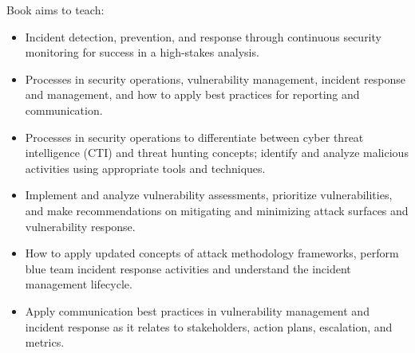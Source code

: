 Book aims to teach:
\begin{itemize}
    \item Incident detection, prevention, and response through continuous security monitoring for success in a high-stakes analysis.
    \item Processes in security operations, vulnerability management, incident response and management, and how to apply best practices for reporting and communication.
    \item Processes in security operations to differentiate between cyber threat intelligence (CTI) and threat hunting concepts; identify and analyze malicious activities using appropriate tools and techniques.
    \item Implement and analyze vulnerability assessments, prioritize vulnerabilities, and make recommendations on mitigating and minimizing attack surfaces and vulnerability response.
    \item How to apply updated concepts of attack methodology frameworks, perform blue team incident response activities and understand the incident management lifecycle.
    \item Apply communication best practices in vulnerability management and incident response as it relates to stakeholders, action plans, escalation, and metrics.
\end{itemize}

